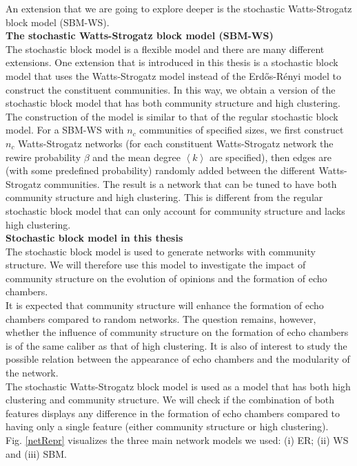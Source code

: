 \documentclass[11 pt , letterpaper , twoside , openright]{book}
\begin{document}
\newline
An extension that we are going to explore deeper is the stochastic Watts-Strogatz block model (SBM-WS).\\
\newline
\textbf{The stochastic Watts-Strogatz block model (SBM-WS)}\\
\newline
The stochastic block model is a flexible model and there are many different extensions. One extension that is introduced in this thesis is a stochastic block model that uses the Watts-Strogatz model instead of the Erd\H{o}s-R\'{e}nyi model to construct the constituent communities. In this way, we obtain a version of the stochastic block model that has both community structure and high clustering.\\
\newline
The construction of the model is similar to that of the regular stochastic block model. For a SBM-WS with $n_c$ communities of specified sizes, we first construct $n_c$ Watts-Strogatz networks (for each constituent Watts-Strogatz network the rewire probability $\beta$ and the mean degree $\left<k\right>$ are specified), then edges are (with some predefined probability) randomly added between the different Watts-Strogatz communities. The result is a network that can be tuned to have both community structure and high clustering. This is different from the regular stochastic block model that can only account for community structure and lacks high clustering.\\
\newline
\textbf{Stochastic block model in this thesis}\\
\newline
The stochastic block model is used to generate networks with community structure. We will therefore use this model to investigate the impact of community structure on the evolution of opinions and the formation of echo chambers.\\
\newline
It is expected that community structure will enhance the formation of echo chambers compared to random networks. The question remains, however, whether the influence of community structure on the formation of echo chambers is of the same caliber as that of high clustering. It is also of interest to study the possible relation between the appearance of echo chambers and the modularity of the network.\\
\newline
The stochastic Watts-Strogatz block model is used as a model that has both high clustering and community structure. We will check if the combination of both features displays any difference in the formation of echo chambers compared to having only a single feature (either community structure or high clustering).\\
\newline
Fig. \ref{netRepr} visualizes the three main network models we used: (i) ER; (ii) WS and (iii) SBM.
\end{document}
